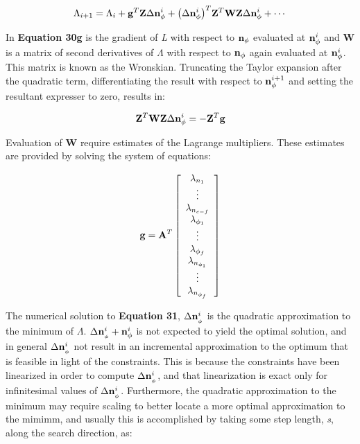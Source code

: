 \documentclass[11pt, titlepage, twoside]{article}
\begin{document}
\begin{MPEquation}[!ht]
\begin{equation}
{\Lambda _{i + 1}} = {\Lambda _i} + {{\bf{g}}^T}{\bf{Z}}\Delta {\bf{n}}_\phi ^i + {\left( {\Delta {\bf{n}}_\phi ^i} \right)^T}{{\bf{Z}}^T}{\bf{WZ}}\Delta {\bf{n}}_\phi ^i +  \cdots
\end{equation}
\label{MPEquationElement:790EE42F-8130-4A01-FB4E-58800DC0E855}
\end{MPEquation}
In \textbf{Equation 30}\textbf{g} is the gradient of \emph{L} with respect to ${\bf{n}}_\phi$ evaluated at ${\bf{n}}_\phi ^i$ and \textbf{W} is a matrix of second derivatives of $\Lambda$ with respect to ${\bf{n}}_\phi$ again evaluated at ${\bf{n}}_\phi ^i$. This matrix is known as the Wronskian. Truncating the Taylor expansion after the quadratic term, differentiating the result with respect to ${\bf{n}}_\phi ^{i + 1}$ and setting the resultant expresser to zero, results in:


\begin{MPEquation}[!ht]
\begin{equation}
{{\bf{Z}}^T}{\bf{WZ}}\Delta {\bf{n}}_\phi ^i =  - {{\bf{Z}}^T}{\bf{g}}
\end{equation}
\label{MPEquationElement:35C8C7EA-4886-4EE6-EA59-92C2590799C2}
\end{MPEquation}
Evaluation of \textbf{W} require estimates of the Lagrange multipliers. These estimates are provided by solving the system of equations:


\begin{MPEquation}[!ht]
\begin{equation}
{\bf{g}} = {{\bf{A}}^T}\left[ {\begin{array}{*{20}{c}}
{{\lambda _{{n_1}}}}\\
 \vdots \\
{{\lambda _{{n_{c - f}}}}}\\
{{\lambda _{{\phi _1}}}}\\
 \vdots \\
{{\lambda _{{\phi _f}}}}\\
{{\lambda _{{n_{{\phi _1}}}}}}\\
 \vdots \\
{{\lambda _{{n_{{\phi _f}}}}}}
\end{array}} \right]
\end{equation}
\label{MPEquationElement:076A4500-9B28-41FE-90F0-C30284C08C27}
\end{MPEquation}
The numerical solution to \textbf{Equation 31}, $\Delta {\bf{n}}_{_\phi }^i$ is the quadratic approximation to the minimum of $\Lambda$. $\Delta {\bf{n}}_{_\phi }^i + {\bf{n}}_\phi ^i$ is not expected to yield the optimal solution, and in general $\Delta {\bf{n}}_{_\phi }^i$ not result in an incremental approximation to the optimum that is feasible in light of the constraints. This is because the constraints have been linearized in order to compute $\Delta {\bf{n}}_{_\phi }^i$, and that linearization is exact only for infinitesimal values of $\Delta {\bf{n}}_{_\phi }^i$. Furthermore, the quadratic approximation to the minimum may require scaling to better locate a more optimal approximation to the mimimm, and usually this is accomplished by taking some step length, \emph{s}, along the search direction, as:
\end{document}
